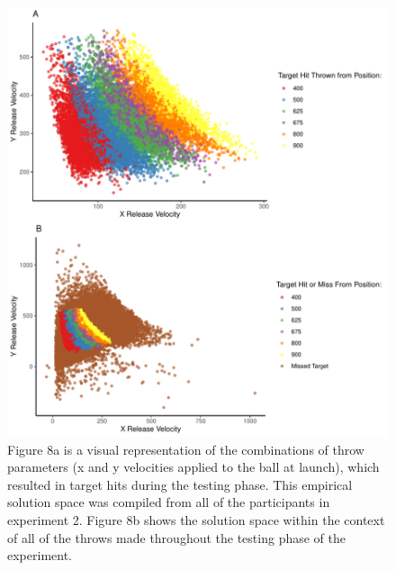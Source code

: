 \documentclass[
  man,floatsintext]{apa7}
\begin{document}
\begin{figure}
\centering
\includegraphics{IGAS_PJ_files/figure-latex/taskSpace-1.pdf}
\caption{\label{fig:taskSpace}Figure 8a is a visual representation of the combinations of throw parameters (x and y velocities applied to the ball at launch), which resulted in target hits during the testing phase. This empirical solution space was compiled from all of the participants in experiment 2. Figure 8b shows the solution space within the context of all of the throws made throughout the testing phase of the experiment.}
\end{figure}
\end{document}
